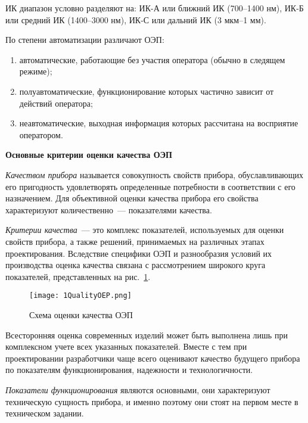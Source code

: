 ИК диапазон условно разделяют на: ИК-А или ближний ИК (700--1400 нм), ИК-Б или средний ИК (1400--3000 нм), ИК-С или дальний ИК (3 мкм--1 мм).

По степени автоматизации различают ОЭП:
\begin{enumerate}
	\item автоматические, работающие без участия оператора (обычно в следящем режиме);
	\item полуавтоматические, функционирование которых частично зависит от действий оператора;
	\item неавтоматические, выходная информация которых рассчитана на восприятие оператором.
\end{enumerate}

\begin{flushleft}
	\textbf{Основные критерии оценки качества ОЭП}
\end{flushleft}

\textit{Качеством прибора} называется совокупность свойств прибора, обуславливающих его пригодность удовлетворять определенные потребности в соответствии с его назначением. Для объективной оценки качества прибора его свойства характеризуют количественно~--- показателями качества.

\textit{Критерии качества}~--- это комплекс показателей, используемых для оценки свойств прибора, а также решений, принимаемых на различных этапах проектирования. Вследствие специфики ОЭП и разнообразия условий их производства оценка качества связана с рассмотрением широкого круга показателей, представленных на рис.~\ref{pic:1QualityOEP}.

\begin{figure}[H]
	\caption{Схема оценки качества ОЭП}
	\texttt{[image: 1QualityOEP.png]}
	\label{pic:1QualityOEP}
\end{figure}

Всесторонняя оценка современных изделий может быть выполнена лишь при комплексном учете всех указанных показателей. Вместе с тем при проектировании разработчики чаще всего оценивают качество будущего прибора по показателям функционирования, надежности и технологичности.

\textit{Показатели функционирования} являются основными, они характеризуют техническую сущность прибора, и именно поэтому они стоят на первом месте в техническом задании.

